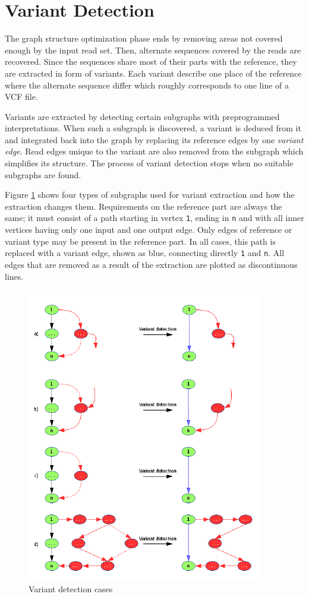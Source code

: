 \section{Variant Detection}
\label{sec:variant-detection}

The graph structure optimization phase ends by removing areas not covered enough by the input read set. Then, alternate sequences covered by the reads are recovered. Since the sequences share most of their parts with the reference, they are extracted in form of variants. Each variant describe one place of the reference where the alternate sequence differ which roughly corresponds to one line of a VCF file.

Variants are extracted by detecting certain subgraphs with preprogrammed interpretations. When such a subgraph is discovered, a variant is deduced from it and integrated back into the graph by replacing its reference edges by one \textit{variant edge}. Read edges unique to the variant are also removed from the subgraph which simplifies its structure. The process of variant detection stops when no suitable subgraphs are found.

Figure \ref{fig:variant-detection} shows four types of subgraphs used for variant extraction and how the extraction changes them. Requirements on the reference part are always the same; it must consist of a path starting in vertex \texttt{1}, ending in \texttt{n} and with all inner vertices having only one input and one output edge. Only edges of reference or variant type may be present in the reference part. In all cases, this path is replaced with a variant edge, shown as blue, connecting directly \texttt{1} and \texttt{n}. All edges that are removed as a result of the extraction are plotted as discontinuous lines.

\begin{figure}[h]
	\centering
	\includegraphics{img/variant-detection.pdf}
	\caption{Variant detection cases}
	\label{fig:variant-detection}
\end{figure}

